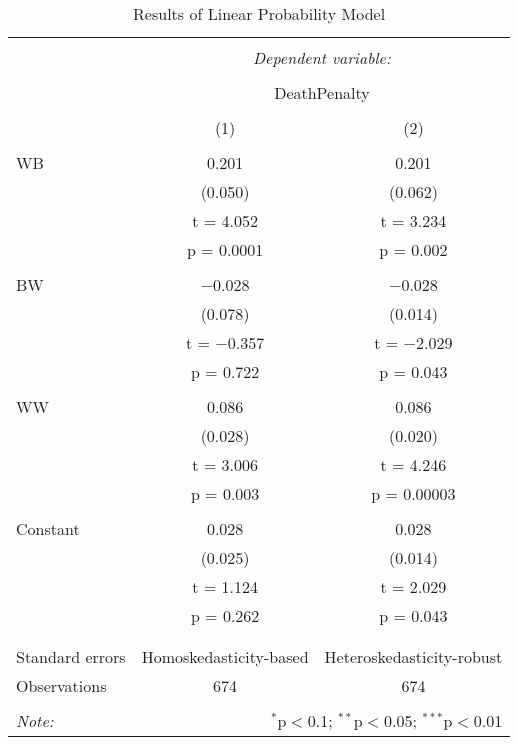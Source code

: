\documentclass[
  12pt,
]{article}
\begin{document}
\begin{table}[!htbp] \centering 
  \caption{Results of Linear Probability Model} 
  \label{} 
\small 
\begin{tabular}{@{\extracolsep{5pt}}lcc} 
\\[-1.8ex]\hline 
\hline \\[-1.8ex] 
 & \multicolumn{2}{c}{\textit{Dependent variable:}} \\ 
\cline{2-3} 
\\[-1.8ex] & \multicolumn{2}{c}{DeathPenalty} \\ 
\\[-1.8ex] & (1) & (2)\\ 
\hline \\[-1.8ex] 
 WB & 0.201 & 0.201 \\ 
  & (0.050) & (0.062) \\ 
  & t = 4.052 & t = 3.234 \\ 
  & p = 0.0001 & p = 0.002 \\ 
  & & \\ 
 BW & $-$0.028 & $-$0.028 \\ 
  & (0.078) & (0.014) \\ 
  & t = $-$0.357 & t = $-$2.029 \\ 
  & p = 0.722 & p = 0.043 \\ 
  & & \\ 
 WW & 0.086 & 0.086 \\ 
  & (0.028) & (0.020) \\ 
  & t = 3.006 & t = 4.246 \\ 
  & p = 0.003 & p = 0.00003 \\ 
  & & \\ 
 Constant & 0.028 & 0.028 \\ 
  & (0.025) & (0.014) \\ 
  & t = 1.124 & t = 2.029 \\ 
  & p = 0.262 & p = 0.043 \\ 
  & & \\ 
\hline \\[-1.8ex] 
Standard errors & Homoskedasticity-based & Heteroskedasticity-robust \\ 
Observations & 674 & 674 \\ 
\hline 
\hline \\[-1.8ex] 
\textit{Note:}  & \multicolumn{2}{r}{$^{*}$p$<$0.1; $^{**}$p$<$0.05; $^{***}$p$<$0.01} \\ 
\end{tabular} 
\end{table}
\end{document}
